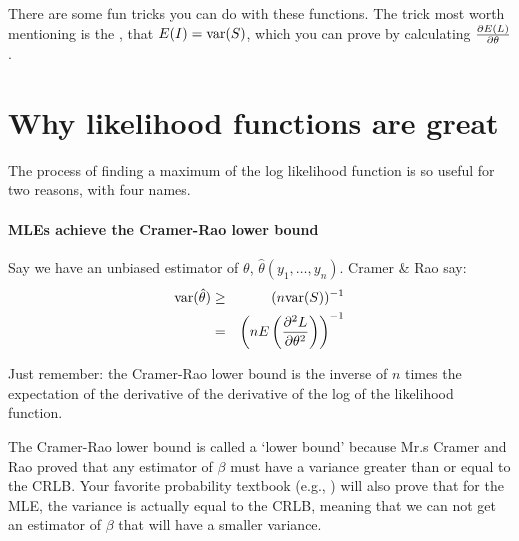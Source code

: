 There are some fun tricks you can do with these functions.
The trick most worth mentioning is the
, that $E(I)=\hbox{var}(S)$, which you can prove by
calculating ${\partial E(L)\over \partial \theta}$.

\section{Why likelihood functions are great} The process of finding a
maximum of the log likelihood function is 
so useful for two reasons, with four names.

\paragraph{MLEs achieve the Cramer-Rao lower bound} 
        		\label{cr} 
Say we have an unbiased estimator of $\theta$,
$\hat\theta(y_1,\dots,y_n)$. Cramer \& Rao say:
\begin{eqnarray}
\hbox{var}(\hat\theta)&\geq&(n \hbox{var}(S))^{-1}		\nonumber\\
		&=&\left(nE\left({\partial^2 L\over \partial
\theta^2}\right)\right)^{-1}			\label{CRLB}
\end{eqnarray}

Just remember: the Cramer-Rao lower bound is the inverse of $n$ times
the expectation of the derivative of the derivative of the log of the
likelihood function.

The Cramer-Rao lower bound is
called a `lower bound' because Mr.s Cramer and Rao proved that any
estimator of $\beta$ must have a variance greater than or equal to the
CRLB. Your favorite probability textbook (e.g., \cite{casella:berger})
will also prove that for the MLE, the variance is actually equal to the
CRLB, meaning that we can not get an estimator of $\beta$ that will
have a smaller variance.

